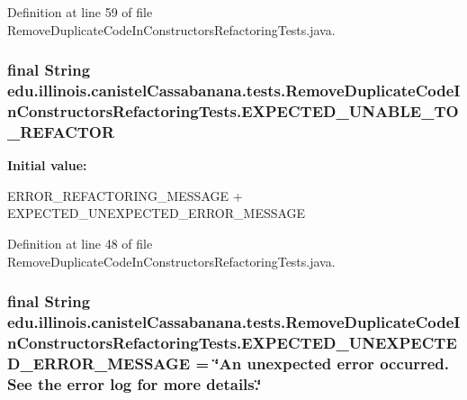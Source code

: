 Definition at line 59 of file RemoveDuplicateCodeInConstructorsRefactoringTests.java.

\hypertarget{classedu_1_1illinois_1_1canistelCassabanana_1_1tests_1_1RemoveDuplicateCodeInConstructorsRefactoringTests_a6662ff002bec870d7dca4f167c1250f0}{
\subsubsection[{EXPECTED\_\-UNABLE\_\-TO\_\-REFACTOR}]{\setlength{\rightskip}{0pt plus 5cm}final String {\bf edu.illinois.canistelCassabanana.tests.RemoveDuplicateCodeInConstructorsRefactoringTests.EXPECTED\_\-UNABLE\_\-TO\_\-REFACTOR}}}
\label{classedu_1_1illinois_1_1canistelCassabanana_1_1tests_1_1RemoveDuplicateCodeInConstructorsRefactoringTests_a6662ff002bec870d7dca4f167c1250f0}
{\bfseries Initial value:}
\begin{DoxyCode}
 ERROR_REFACTORING_MESSAGE
               + EXPECTED_UNEXPECTED_ERROR_MESSAGE
\end{DoxyCode}


Definition at line 48 of file RemoveDuplicateCodeInConstructorsRefactoringTests.java.

\hypertarget{classedu_1_1illinois_1_1canistelCassabanana_1_1tests_1_1RemoveDuplicateCodeInConstructorsRefactoringTests_aefdabf6f4f74c8e0866595aee2f9aa4f}{
\subsubsection[{EXPECTED\_\-UNEXPECTED\_\-ERROR\_\-MESSAGE}]{\setlength{\rightskip}{0pt plus 5cm}final String {\bf edu.illinois.canistelCassabanana.tests.RemoveDuplicateCodeInConstructorsRefactoringTests.EXPECTED\_\-UNEXPECTED\_\-ERROR\_\-MESSAGE} = \char`\"{}An unexpected error occurred. See the error log for more details.\char`\"{}}}
\label{classedu_1_1illinois_1_1canistelCassabanana_1_1tests_1_1RemoveDuplicateCodeInConstructorsRefactoringTests_aefdabf6f4f74c8e0866595aee2f9aa4f}


